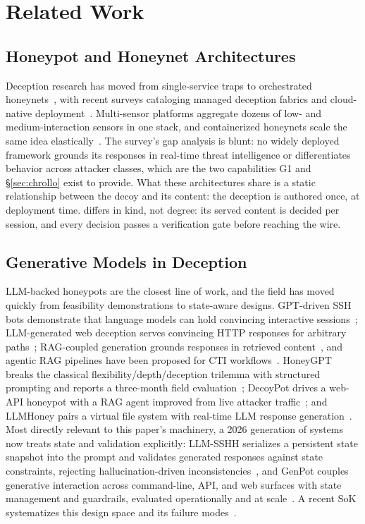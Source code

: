 \section{Related Work}
\label{sec:related}

\subsection{Honeypot and Honeynet Architectures}
Deception research has moved from single-service traps to orchestrated
honeynets~\cite{spitzner2002}, with recent surveys cataloging managed
deception fabrics and cloud-native deployment~\cite{lopez2024}. Multi-sensor
platforms aggregate dozens of low- and medium-interaction sensors in one
stack, and containerized honeynets scale the same idea
elastically~\cite{t-pot2024}. The survey's gap analysis is blunt: no
widely deployed framework grounds its responses in real-time threat
intelligence or differentiates behavior across attacker classes, which
are the two capabilities G1 and \S\ref{sec:chrollo} exist to provide.
What these architectures share is a static
relationship between the decoy and its content: the deception is authored
once, at deployment time. \system differs in kind, not degree: its served
content is decided per session, and every decision passes a verification
gate before reaching the wire.

\subsection{Generative Models in Deception}
LLM-backed honeypots are the closest line of work, and the field has
moved quickly from feasibility demonstrations to state-aware designs.
GPT-driven SSH bots demonstrate that language models can hold convincing
interactive sessions~\cite{kouremetis2024}; LLM-generated web deception
serves convincing HTTP responses for arbitrary paths~\cite{galah2024};
RAG-coupled generation grounds responses in retrieved
content~\cite{qiao2025,sezgin2025decoypot}, and agentic RAG pipelines
have been proposed for CTI workflows~\cite{belmahjoub2025,gao2025}.
HoneyGPT breaks the classical flexibility/depth/deception trilemma with
structured prompting and reports a three-month field
evaluation~\cite{wang2026honeygpt}; DecoyPot drives a web-API honeypot
with a RAG agent improved from live attacker
traffic~\cite{sezgin2025decoypot}; and LLMHoney pairs a virtual file
system with real-time LLM response generation~\cite{malhotra2025llmhoney}.
Most directly relevant to this paper's machinery, a 2026 generation of
systems now treats state and validation explicitly: LLM-SSHH serializes a
persistent state snapshot into the prompt and validates generated
responses against state constraints, rejecting hallucination-driven
inconsistencies~\cite{li2026llmsshh}, and GenPot couples generative
interaction across command-line, API, and web surfaces with state
management and guardrails, evaluated operationally and at
scale~\cite{laragutierrez2026genpot}. A recent SoK systematizes this
design space and its failure modes~\cite{bridges2026}.


